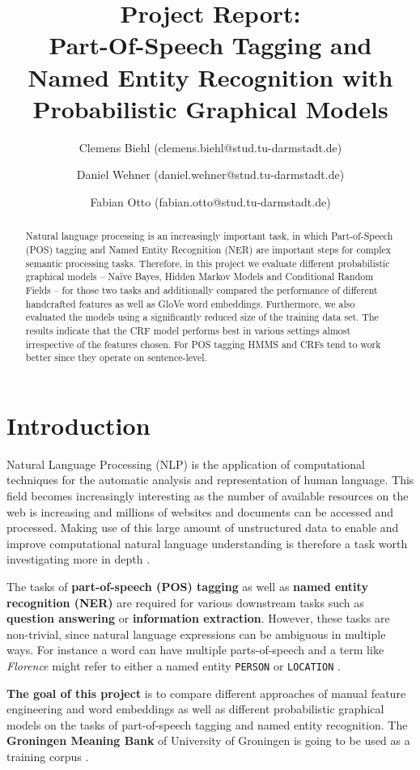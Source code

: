 \documentclass[twocolumns]{IEEEtran}
\title{Project Report:\\ Part-Of-Speech Tagging and Named Entity Recognition with Probabilistic Graphical Models}
\author[1]{Clemens Biehl (clemens.biehl@stud.tu-darmstadt.de)}
\author[1]{Daniel Wehner (daniel.wehner@stud.tu-darmstadt.de)}
\author[1]{Fabian Otto (fabian.otto@stud.tu-darmstadt.de)}
\affil[1]{Technische Universität Darmstadt}
\begin{document}
\maketitle
\begin{abstract}
Natural language processing is an increasingly important task, in which Part-of-Speech (POS) tagging and Named Entity Recognition (NER) are important steps for complex semantic processing tasks. Therefore, in this project we evaluate different probabilistic graphical models -- Na\"ive Bayes, Hidden Markov Models and Conditional Random Fields -- for those two tasks and additionally compared the performance of different handcrafted features as well as GloVe word embeddings. Furthermore, we also evaluated the models using a significantly reduced size of the training data set. The results indicate that the CRF model performs best in various settings almost irrespective of the features chosen. For POS tagging HMMS and CRFs tend to work better since they operate on sentence-level. 
\end{abstract}

\section{Introduction}
Natural Language Processing (NLP) is the application of computational techniques for the automatic analysis and representation of human language. This field becomes increasingly interesting as the number of available resources on the web is increasing and millions of websites and documents can be accessed and processed. Making use of this large amount of unstructured data to enable and improve computational natural language understanding is therefore a task worth investigating more in depth \cite{nlpintro}.

The tasks of \textbf{part-of-speech (POS) tagging} as well as \textbf{named entity recognition (NER)} are required for various downstream tasks such as \textbf{question answering} or \textbf{information extraction}. However, these tasks are non-trivial, since natural language expressions can be ambiguous in multiple ways. For instance a word can have multiple parts-of-speech and a term like \textit{Florence} might refer to either a named entity \texttt{PERSON} or \texttt{LOCATION} \cite[cf. pages 167-169]{Jurafsky}.

\textbf{The goal of this project} is to compare different approaches of manual feature engineering and word embeddings as well as different probabilistic graphical models on the tasks of part-of-speech tagging and named entity recognition. The \textbf{Groningen Meaning Bank} of University of Groningen is going to be used as a training corpus \cite{Bos2017GMB}.
\end{document}
